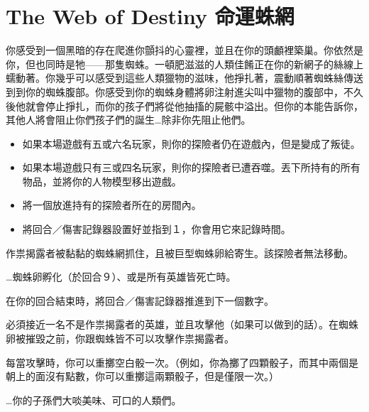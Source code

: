 
\chapter{The Web of Destiny 命運蛛網}

\begin{HauntStory}
  你感受到一個黑暗的存在爬進你顫抖的心靈裡，並且在你的頭顱裡築巢。你依然是你，但也同時是牠——那隻蜘蛛。一頓肥滋滋的人類佳餚正在你的新網子的絲線上蠕動著。你幾乎可以感受到這些人類獵物的滋味，他掙扎著，震動順著蜘蛛絲傳送到到你的蜘蛛腹部。你感受到你的蜘蛛身體將卵注射進尖叫中獵物的腹部中，不久後他就會停止掙扎，而你的孩子們將從他抽搐的屍骸中溢出。但你的本能告訴你，其他人將會阻止你們孩子們的誕生…除非你先阻止他們。
\end{HauntStory}

\vspace*{-1em}
\begin{itemize}
  \item 如果本場遊戲有五或六名玩家，則你的探險者仍在遊戲內，但是變成了叛徒。
  \item 如果本場遊戲只有三或四名玩家，則你的探險者已遭吞噬。丟下所持有的所有物品，並將你的人物模型移出遊戲。
  \item 將一個放進持有的探險者所在的房間內。
  \item 將回合／傷害記錄器設置好並指到１，你會用它來記錄時間。
\end{itemize}

作祟揭露者被黏黏的蜘蛛網抓住，且被巨型蜘蛛卵給寄生。該探險者無法移動。

…蜘蛛卵孵化（於回合９）、或是所有英雄皆死亡時。

在你的回合結束時，將回合／傷害記錄器推進到下一個數字。

\vfill\null\pagebreak

必須接近一名不是作祟揭露者的英雄，並且攻擊他（如果可以做到的話）。在蜘蛛卵被摧毀之前，你跟蜘蛛皆不可以攻擊作祟揭露者。


每當攻擊時，你可以重擲空白骰一次。（例如，你為擲了四顆骰子，而其中兩個是朝上的面沒有點數，你可以重擲這兩顆骰子，但是僅限一次。）

\begin{HauntStory}
  …你的子孫們大啖美味、可口的人類們。
\end{HauntStory}
